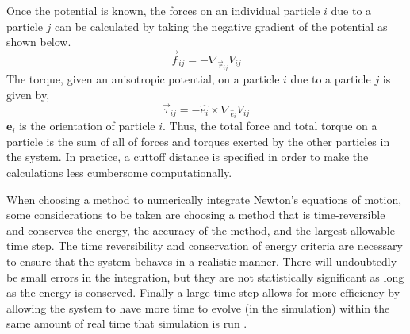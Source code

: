 \documentclass[preprint, aps]{revtex4-1}
\begin{document}
Once the potential is known, the forces on an individual particle $i$ due to a 
particle $j$ can be calculated by taking the negative gradient of the potential 
as shown below.
	\begin{equation} \label{force}
		\vec{f}_{ij}=-\nabla_{\vec{r}_{ij}}V_{ij}
	\end{equation}
The torque, given an anisotropic potential, on a particle $i$ due to a particle 
$j$ is given by,
	\begin{equation} \label{torque}
		\vec{\tau}_{ij}=-\hat{e_i}\times\nabla_{\hat{e}_{i}}V_{ij}
	\end{equation}
$\mathbf{e}_{i}$ is the orientation of particle $i$. Thus, the total force and 
total torque on a particle is the sum of all of forces and torques exerted by 
the other particles in the system. In practice, a cuttoff distance is specified 
in order to make the calculations less cumbersome computationally.
	
When choosing a method to numerically integrate Newton's equations of motion, 
some considerations to be taken are choosing a method that is time-reversible 
and conserves the energy, the accuracy of the method, and the largest allowable 
time step. The time reversibility and conservation of energy criteria are 
necessary to ensure that the system behaves in a realistic manner. There will
undoubtedly be small errors in the integration, but they are not statistically
significant as long as the energy is conserved. Finally a large time step allows
for more efficiency by allowing the system to have more time to evolve (in the
simulation) within the same amount of real time that simulation is run
\cite{frenkel01}.
\end{document}
